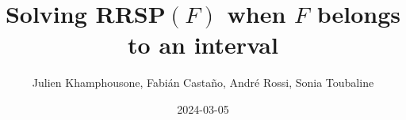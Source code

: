 \documentclass{article}
\begin{document}
     \title{Solving RRSP$(F)$ when $F$ belongs to an interval}
     \author{Julien Khamphousone, Fabi\'an Casta\~no, Andr\'e Rossi, Sonia Toubaline}
     \date{2024-03-05}
     \maketitle
     \def\F{{0.0,0.1142857,0.1466667,1.784,2.6666667,3.2571429,6.2333333,6.8566667}}
\def\gF{{15.09000000000000000000000000000000000000000000000000000000000000000000000000005,15.90142859999999999999999999999999999999999999999999999999999999999999999999998,16.07466670000000000000000000000000000000000000000000000000000000000000000000008,22.37839999999999999999999999999999999999999999999999999999999999999999999999993,24.67333330000000000000000000000000000000000000000000000000000000000000000000005,26.12000000000000000000000000000000000000000000000000000000000000000000000000007,31.32833329999999999999999999999999999999999999999999999999999999999999999999993,2608.29833333333333469224631547452502295702171865108997308438029683053116514202}}
\end{document}
